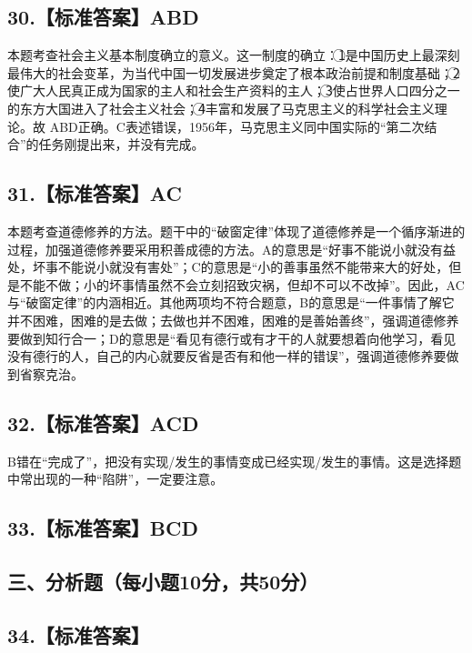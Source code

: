 \documentclass[UTF8,11pt]{ctexart}
\begin{document}
\subsection*{30.【标准答案】ABD}

本题考查社会主义基本制度确立的意义。这一制度的确立：\textcircled{1}是中国历史上最深刻最伟大的社会变革，为当代中国一切发展进步奠定了根本政治前提和制度基础；\textcircled{2}使广大人民真正成为国家的主人和社会生产资料的主人；\textcircled{3}使占世界人口四分之一的东方大国进入了社会主义社会；\textcircled{4}丰富和发展了马克思主义的科学社会主义理论。故 ABD正确。C表述错误，1956年，马克思主义同中国实际的“第二次结合”的任务刚提出来，并没有完成。


\subsection*{31.【标准答案】AC}

本题考查道德修养的方法。题干中的“破窗定律”体现了道德修养是一个循序渐进的过程，加强道德修养要采用积善成德的方法。A的意思是“好事不能说小就没有益处，坏事不能说小就没有害处”；C的意思是“小的善事虽然不能带来大的好处，但是不能不做；小的坏事情虽然不会立刻招致灾祸，但却不可以不改掉”。因此，AC与“破窗定律”的内涵相近。其他两项均不符合题意，B的意思是“一件事情了解它并不困难，困难的是去做；去做也并不困难，困难的是善始善终”，强调道德修养要做到知行合一；D的意思是“看见有德行或有才干的人就要想着向他学习，看见没有德行的人，自己的内心就要反省是否有和他一样的错误”，强调道德修养要做到省察克治。


\subsection*{32.【标准答案】ACD}

B错在“完成了”，把没有实现/发生的事情变成已经实现/发生的事情。这是选择题中常出现的一种“陷阱”，一定要注意。


\subsection*{33.【标准答案】BCD}

\subsection*{三、分析题（每小题10分，共50分）}

\subsection*{34.【标准答案】}
\end{document}
